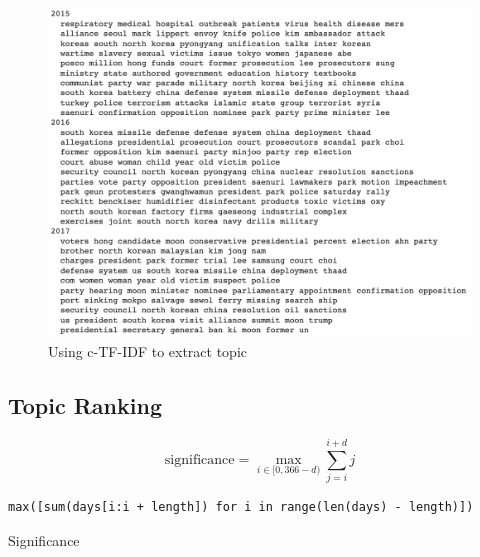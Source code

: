 \documentclass[sigconf,authorversion,nonacm]{acmart}
\begin{document}
\begin{figure}[ht]
    \includegraphics[width=0.9\linewidth]{img/body_ctfidf.png}
    \caption{Using c-TF-IDF to extract topic}
\end{figure}

\subsection{Topic Ranking}
\begin{equation}
    \text{significance} = \max_{i\in[0, 366-d)}\sum^{i+d}_{j=i}j
    \label{eq:sig}
\end{equation}

\begin{listing}[ht]
\begin{verbatim}
max([sum(days[i:i + length]) for i in range(len(days) - length)])
\end{verbatim}
\caption{Significance}
\end{listing}
\end{document}
